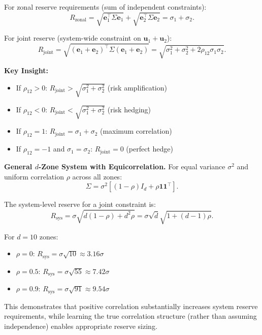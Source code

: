 \documentclass[lettersize,journal]{IEEEtran}
\newcommand{\bu}{\bm{u}}
\theoremstyle{definition}
\begin{document}
For zonal reserve requirements (sum of independent constraints):
\begin{equation}
R_{\text{zonal}} = \sqrt{\bm{e}_1^\top \Sigma \bm{e}_1} + \sqrt{\bm{e}_2^\top \Sigma \bm{e}_2} = \sigma_1 + \sigma_2.
\end{equation}

For joint reserve (system-wide constraint on $\bu_1 + \bu_2$):
\begin{equation}
R_{\text{joint}} = \sqrt{(\bm{e}_1 + \bm{e}_2)^\top \Sigma (\bm{e}_1 + \bm{e}_2)} = \sqrt{\sigma_1^2 + \sigma_2^2 + 2\rho_{12}\sigma_1\sigma_2}.
\end{equation}

\textbf{Key Insight:}
\begin{itemize}
\item If $\rho_{12} > 0$: $R_{\text{joint}} > \sqrt{\sigma_1^2 + \sigma_2^2}$ (risk amplification)
\item If $\rho_{12} < 0$: $R_{\text{joint}} < \sqrt{\sigma_1^2 + \sigma_2^2}$ (risk hedging)
\item If $\rho_{12} = 1$: $R_{\text{joint}} = \sigma_1 + \sigma_2$ (maximum correlation)
\item If $\rho_{12} = -1$ and $\sigma_1 = \sigma_2$: $R_{\text{joint}} = 0$ (perfect hedge)
\end{itemize}

\textbf{General $d$-Zone System with Equicorrelation.} For equal variance $\sigma^2$ and uniform correlation $\rho$ across all zones:
\begin{equation}
\Sigma = \sigma^2\left[(1-\rho)I_d + \rho \bm{1}\bm{1}^\top\right].
\end{equation}

The system-level reserve for a joint constraint is:
\begin{equation}
R_{\text{sys}} = \sigma\sqrt{d(1-\rho) + d^2\rho} = \sigma\sqrt{d}\sqrt{1 + (d-1)\rho}.
\end{equation}

For $d = 10$ zones:
\begin{itemize}
\item $\rho = 0$: $R_{\text{sys}} = \sigma\sqrt{10} \approx 3.16\sigma$
\item $\rho = 0.5$: $R_{\text{sys}} = \sigma\sqrt{55} \approx 7.42\sigma$
\item $\rho = 0.9$: $R_{\text{sys}} = \sigma\sqrt{91} \approx 9.54\sigma$
\end{itemize}

This demonstrates that positive correlation substantially increases system reserve requirements, while learning the true correlation structure (rather than assuming independence) enables appropriate reserve sizing.
\end{document}
